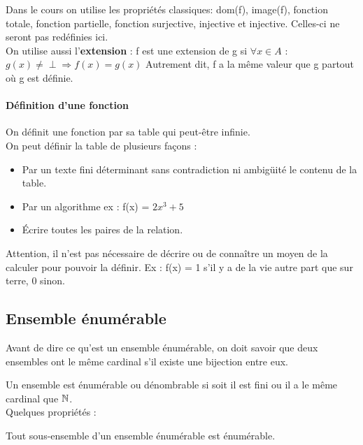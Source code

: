 Dans le cours on utilise les propriétés classiques: dom(f), image(f), fonction totale,
fonction partielle, fonction surjective, injective et injective. Celles-ci ne 
seront pas redéfinies ici.\\
On utilise aussi l'\textbf{extension} : 
f est une extension de g si $\forall x \in A$ : $g(x)\neq \perp \Rightarrow f(x) = g(x)$
Autrement dit, f a la même valeur que g partout où g est définie.

\paragraph{Définition d'une fonction}
\label{par:d_finition_d_une_fonciton}
On définit une fonction par sa table qui peut-être infinie.\\
On peut définir la table de plusieurs façons :
\begin{itemize}
	\item Par un texte fini déterminant sans contradiction ni ambigüité le contenu
		de la table.
	\item Par un algorithme ex : f(x) = $2x^3+5$
	\item Écrire toutes les paires de la relation.
\end{itemize}
Attention, il n'est pas nécessaire de décrire ou de connaître un moyen de la calculer
pour pouvoir la définir. Ex : f(x) = 1 s'il y a de la vie autre part que sur terre,
0 sinon.

\subsection{Ensemble énumérable}
\label{sub:ensemble_num_rables}

Avant de dire ce qu'est un ensemble énumérable, on doit savoir que deux ensembles
ont le même cardinal s’il existe une bijection entre eux.

\begin{mydef}
	Un ensemble est énumérable ou dénombrable si soit il est fini ou il a le même cardinal que $\mathbb{\mathbb{N}}$. \\
	Quelques propriétés : 
\end{mydef}
	
\begin{myprop}
	Tout sous-ensemble d'un ensemble énumérable est énumérable.
\end{myprop}

